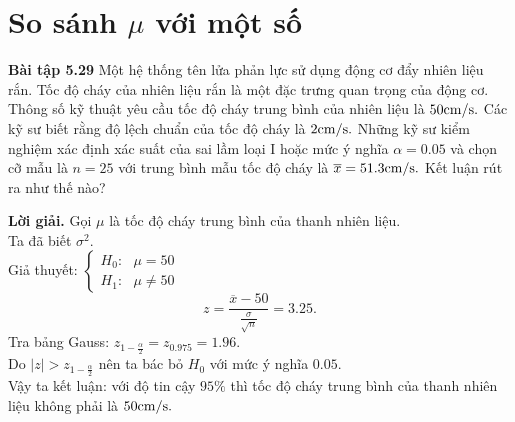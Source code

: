 \section{So sánh $\mu$ với một số}
\begin{mybox}
\textbf{Bài tập 5.29} Một hệ thống tên lửa phản lực sử dụng động cơ đẩy nhiên liệu rắn. Tốc độ cháy của nhiên liệu rắn là một đặc trưng quan trọng của động cơ. Thông số kỹ thuật yêu cầu tốc độ cháy trung bình của nhiên liệu là $50 \mathrm{{{cm} \mathord{\left/
 {\vphantom {{cm} s}} \right.
 \kern-\nulldelimiterspace} s}}.$ Các kỹ sư biết rằng độ lệch chuẩn của tốc độ cháy là $2 \mathrm{{{cm} \mathord{\left/
 {\vphantom {{cm} s}} \right.
 \kern-\nulldelimiterspace} s}}.$ Những kỹ sư kiểm nghiệm xác định xác suất của sai lầm loại I hoặc mức ý nghĩa $\alpha = 0.05$ và chọn cỡ mẫu là $n = 25$ với trung bình mẫu tốc độ cháy là $\overline{x} = 51.3 \mathrm{{{cm} \mathord{\left/
 {\vphantom {{cm} s}} \right.
 \kern-\nulldelimiterspace} s}}.$ Kết luận rút ra như thế nào?
\end{mybox}   
\textbf{Lời giải.} Gọi $\mu$ là tốc độ cháy trung bình của thanh nhiên liệu.\\
Ta đã biết $\sigma^2.$\\
Giả thuyết: $\begin{cases}
H_0: \text{ } \mu = 50\\
H_1: \text{ } \mu \ne 50
\end{cases} $ \\
$$z = \frac{\overline{x} - 50}{\frac{\sigma}{\sqrt{n}}} = 3.25.$$
Tra bảng Gauss: $z_{1 - \frac{\alpha}{2}}  = z_{0.975} = 1.96.$\\
Do $\left| z \right| > z_{1 - \frac{\alpha}{2}}$ nên ta bác bỏ $H_0$ với mức ý nghĩa $0.05.$\\
Vậy ta kết luận: với độ tin cậy $95\%$ thì tốc độ cháy trung bình của thanh nhiên liệu không phải là $50 \mathrm{{{cm} \mathord{\left/
 {\vphantom {{cm} s}} \right.
 \kern-\nulldelimiterspace} s}}.$
 
